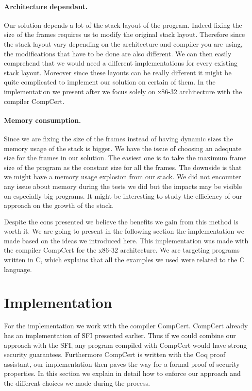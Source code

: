\documentclass[11pt]{sdm}
\begin{document}
\paragraph{Architecture dependant.}
\label{par:Architecture dependant}
Our solution depends a lot of the stack layout of the program.
Indeed fixing the size of the frames requires us to modify the original stack layout.
Therefore since the stack layout vary depending on the architecture and compiler you are using, the modifications that have to be done are also different.
We can then easily comprehend that we would need a different implementations for every existing stack layout.
Moreover since these layouts can be really different it might be quite complicated to implement our solution on certain of them.
In the implementation we present after we focus solely on x86-32 architecture with the compiler CompCert.

\paragraph{Memory consumption.}
\label{par:Memory consumption}
Since we are fixing the size of the frames instead of having dynamic sizes the memory usage of the stack is bigger. We have the issue of choosing an adequate size for the frames in our solution. The easiest one is to take the maximum frame size of the program as the constant size for all the frames. The downside is that we might have a memory usage explosion from our stack.
We did not encounter any issue about memory during the tests we did but the impacts may be visible on especially big programs. It might be interesting to study the efficiency of our approach on the growth of the stack.

Despite the cons presented we believe the benefits we gain from this method is worth it.
We are going to present in the following section the implementation we made based on the ideas we introduced here. This implementation was made with the compiler CompCert for the x86-32 architecture. We are targeting programs written in C, which explains that all the examples we used were related to the C language.


\newpage
\section{Implementation}
\label{sec:implementation}

For the implementation we work with the compiler CompCert. CompCert already has an implementation of SFI presented earlier. Thus if we could combine our approach with the SFI, any program compiled with CompCert would have strong security guarantees. Furthermore CompCert is written with the Coq proof assistant, our implementation then paves the way for a formal proof of security properties. In this section we explain in detail how to enforce our approach and the different choices we made during the process.
\end{document}
